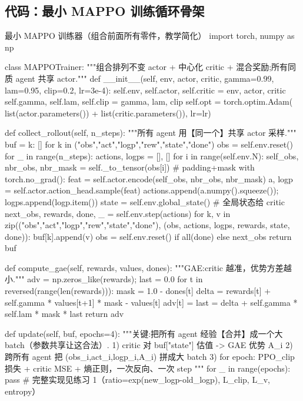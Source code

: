 \subsection{代码：最小 MAPPO 训练循环骨架}
\label{sec:mc-train-code}

\begin{codebox}[Python]{最小 MAPPO 训练器（组合前面所有零件，教学简化）}
import torch, numpy as np

class MAPPOTrainer:
    """组合排列不变 actor + 中心化 critic + 混合奖励;所有同质 agent 共享 actor."""
    def __init__(self, env, actor, critic, gamma=0.99, lam=0.95, clip=0.2, lr=3e-4):
        self.env, self.actor, self.critic = env, actor, critic
        self.gamma, self.lam, self.clip = gamma, lam, clip
        self.opt = torch.optim.Adam(
            list(actor.parameters()) + list(critic.parameters()), lr=lr)

    def collect_rollout(self, n_steps):
        """所有 agent 用【同一个】共享 actor 采样."""
        buf = {k: [] for k in ("obs","act","logp","rew","state","done")}
        obs = self.env.reset()
        for _ in range(n_steps):
            actions, logps = [], []
            for i in range(self.env.N):
                self_obs, nbr_obs, nbr_mask = self._to_tensor(obs[i])  # padding+mask
                with torch.no_grad():
                    feat = self.actor.encode(self_obs, nbr_obs, nbr_mask)
                    a, logp = self.actor.action_head.sample(feat)
                actions.append(a.numpy().squeeze()); logps.append(logp.item())
            state = self.env.global_state()              # 全局状态给 critic
            next_obs, rewards, done, _ = self.env.step(actions)
            for k, v in zip(("obs","act","logp","rew","state","done"),
                            (obs, actions, logps, rewards, state, done)):
                buf[k].append(v)
            obs = self.env.reset() if all(done) else next_obs
        return buf

    def compute_gae(self, rewards, values, dones):
        """GAE:critic 越准，优势方差越小."""
        adv = np.zeros_like(rewards); last = 0.0
        for t in reversed(range(len(rewards))):
            mask = 1.0 - dones[t]
            delta = rewards[t] + self.gamma * values[t+1] * mask - values[t]
            adv[t] = last = delta + self.gamma * self.lam * mask * last
        return adv

    def update(self, buf, epochs=4):
        """关键:把所有 agent 经验【合并】成一个大 batch（参数共享让这合法）.
        1) critic 对 buf["state"] 估值 -> GAE 优势 A_i
        2) 跨所有 agent 把 (obs_i,act_i,logp_i,A_i) 拼成大 batch
        3) for epoch: PPO_clip 损失 + critic MSE + 熵正则，一次反向、一次 step
        """
        for _ in range(epochs):
            pass    # 完整实现见练习 1（ratio=exp(new_logp-old_logp), L_clip, L_v, entropy）


\end{codebox}
